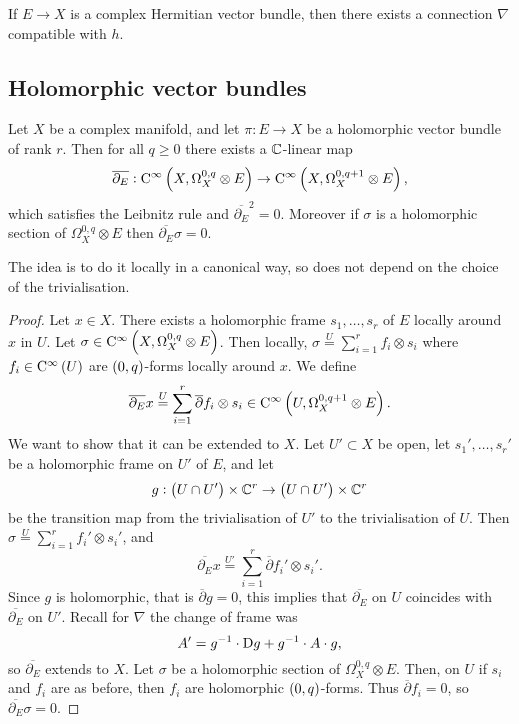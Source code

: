 \begin{theorem}
If $ E \to X $ is a complex Hermitian vector bundle, then there exists a connection $ \nabla $ compatible with $ h $.
\end{theorem}

\subsection{Holomorphic vector bundles}


\begin{proposition}
\label{prop:5.9}
Let $ X $ be a complex manifold, and let $ \pi : E \to X $ be a holomorphic vector bundle of rank $ r $. Then for all $ q \ge 0 $ there exists a $ \mathbb{C} $-linear map
$$ \overline{\partial_E} : \C^\infty\br{X, \Omega_X^{0, q} \otimes E} \to \C^\infty\br{X, \Omega_X^{0, q + 1} \otimes E}, $$
which satisfies the Leibnitz rule and $ \overline{\partial_E}^2 = 0 $. Moreover if $ \sigma $ is a holomorphic section of $ \Omega_X^{0, q} \otimes E $ then $ \overline{\partial_E}\sigma = 0 $.
\end{proposition}

\pagebreak

The idea is to do it locally in a canonical way, so does not depend on the choice of the trivialisation.

\begin{proof}
Let $ x \in X $. There exists a holomorphic frame $ s_1, \dots, s_r $ of $ E $ locally around $ x $ in $ U $. Let $ \sigma \in \C^\infty\br{X, \Omega_X^{0, q} \otimes E} $. Then locally, $ \sigma \overset{U}{=} \sum_{i = 1}^r f_i \otimes s_i $ where $ f_i \in \C^\infty\br{U} $ are $ \br{0, q} $-forms locally around $ x $. We define
$$ \overline{\partial_E}x \overset{U}{=} \sum_{i = 1}^r \overline{\partial}f_i \otimes s_i \in \C^\infty\br{U, \Omega_X^{0, q + 1} \otimes E}. $$
We want to show that it can be extended to $ X $. Let $ U' \subset X $ be open, let $ s_1', \dots, s_r' $ be a holomorphic frame on $ U' $ of $ E $, and let
$$ g : \br{U \cap U'} \times \CC^r \to \br{U \cap U'} \times \CC^r $$
be the transition map from the trivialisation of $ U' $ to the trivialisation of $ U $. Then $ \sigma \overset{U}{=} \sum_{i = 1}^r f_i' \otimes s_i' $, and
$$ \overline{\partial_E}x \overset{U'}{=} \sum_{i = 1}^r \overline{\partial}f_i' \otimes s_i'. $$
Since $ g $ is holomorphic, that is $ \overline{\partial}g = 0 $, this implies that $ \overline{\partial_E} $ on $ U $ coincides with $ \overline{\partial_E} $ on $ U' $. Recall for $ \nabla $ the change of frame was
$$ A' = g^{-1} \cdot \mathrm{D} g + g^{-1} \cdot A \cdot g, $$
so $ \overline{\partial_E} $ extends to $ X $. Let $ \sigma $ be a holomorphic section of $ \Omega_X^{0, q} \otimes E $. Then, on $ U $ if $ s_i $ and $ f_i $ are as before, then $ f_i $ are holomorphic $ \br{0, q} $-forms. Thus $ \overline{\partial}f_i = 0 $, so $ \overline{\partial_E}\sigma = 0 $.
\end{proof}

